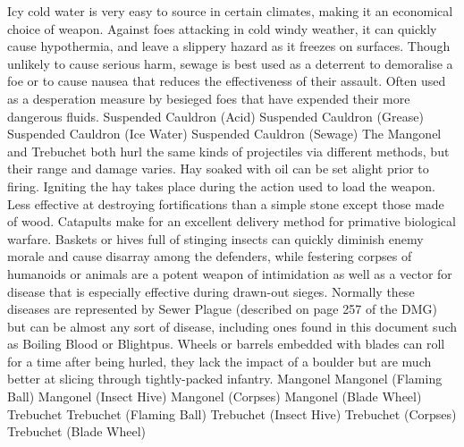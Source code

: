 \documentclass[10pt,a4paper,twoside,twocolumn,openany,bg=print,nodeprecatedcode]{dndbook}
\begin{document}
Icy cold water is very easy to source in certain climates, making it an economical choice of weapon. Against foes attacking in cold windy weather, it can quickly cause hypothermia, and leave a slippery hazard as it freezes on surfaces.
Though unlikely to cause serious harm, sewage is best used as a deterrent to demoralise a foe or to cause nausea that reduces the effectiveness of their assault. Often used as a desperation measure by besieged foes that have expended their more dangerous fluids.
Suspended Cauldron (Acid)
Suspended Cauldron (Grease)
Suspended Cauldron (Ice Water)
Suspended Cauldron (Sewage)
The Mangonel and Trebuchet both hurl the same kinds of projectiles via different methods, but their range and damage varies.
Hay soaked with oil can be set alight prior to firing. Igniting the hay takes place during the action used to load the weapon. Less effective at destroying fortifications than a simple stone except those made of wood.
Catapults make for an excellent delivery method for primative biological warfare. Baskets or hives full of stinging insects can quickly diminish enemy morale and cause disarray among the defenders, while festering corpses of humanoids or animals are a potent weapon of intimidation as well as a vector for disease that is especially effective during drawn-out sieges. Normally these diseases are represented by Sewer Plague (described on page 257 of the DMG) but can be almost any sort of disease, including ones found in this document such as Boiling Blood or Blightpus.
Wheels or barrels embedded with blades can roll for a time after being hurled, they lack the impact of a boulder but are much better at slicing through tightly-packed infantry.
Mangonel
Mangonel (Flaming Ball)
Mangonel (Insect Hive)
Mangonel (Corpses)
Mangonel (Blade Wheel)
Trebuchet
Trebuchet (Flaming Ball)
Trebuchet (Insect Hive)
Trebuchet (Corpses)
Trebuchet (Blade Wheel)
\end{document}
